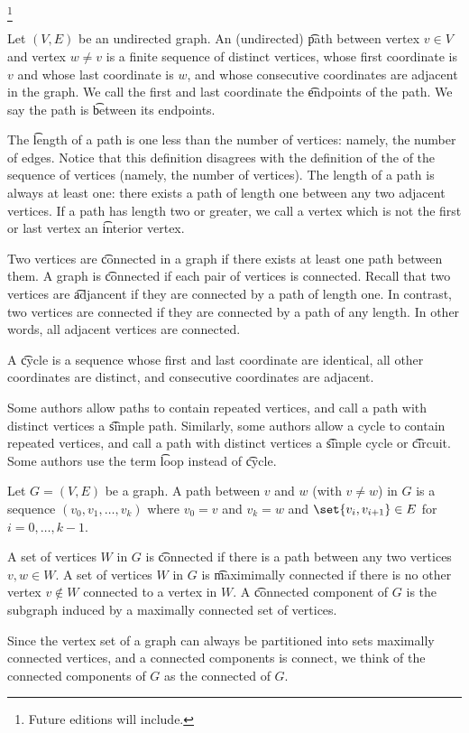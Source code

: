 
\footnote{Future editions will include.}


Let $(V, E)$ be an undirected graph.
An (undirected) \t{path} between vertex $v \in V$ and vertex $w \neq v$ is a finite sequence of distinct vertices, whose first coordinate is $v$ and whose last coordinate is $w$, and whose consecutive coordinates are adjacent in the graph.
We call the first and last coordinate the \t{endpoints} of the path.
We say the path is \t{between} its endpoints.

The \t{length} of a path is one less than the number of vertices: namely, the number of edges.
Notice that this definition disagrees with the definition of the  of the sequence of vertices (namely, the number of vertices).
The length of a path is always at least one: there exists a path of length one between any two adjacent vertices.
If a path has length two or greater, we call a vertex which is not the first or last vertex an \t{interior vertex}.

Two vertices are \t{connected} in a graph if there exists at least one path between them.
A graph is \t{connected} if each pair of vertices is connected.
Recall that two vertices are \t{adjancent} if they are connected by a path of length one.
In contrast, two vertices are connected if they are connected by a path of any length.
In other words, all adjacent vertices are connected.

A \t{cycle} is a sequence whose first and last coordinate are identical, all other coordinates are distinct, and consecutive coordinates are adjacent.


Some authors allow paths to contain repeated vertices, and call a path with distinct vertices a \t{simple path}.
Similarly, some authors allow a cycle to contain repeated vertices, and call a path with distinct vertices a \t{simple cycle} or \t{circuit}.
Some authors use the term \t{loop} instead of \t{cycle}.


Let $G = (V, E)$ be a graph.
A path between $v$ and $w$ (with $v \neq w$) in $G$ is a sequence $(v_0, v_1, \dots, v_k)$ where $v_0 = v$ and $v_k = w$ and $\set{v_i, v_{i+1}} \in E$ for $i = 0, \dots, k-1$.


A set of vertices $W$ in $G$ is \t{connected} if there is a path between any two vertices $v, w \in W$.
A set of vertices $W$ in $G$ is \t{maximimally connected} if there is no other vertex $v \not \in W$ connected to a vertex in $W$.
A \t{connected component} of $G$ is the subgraph induced by a maximally connected set of vertices.

Since the vertex set of a graph can always be partitioned into sets maximally connected vertices, and a connected components is connect, we think of the connected components of $G$ as the connected  of $G$.
